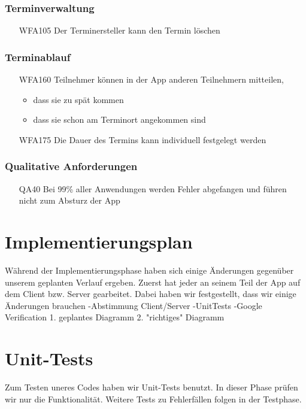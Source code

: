 \documentclass{scrartcl}
\begin{document}
	\subsubsection{Terminverwaltung}
	\begin{itemize}
		\item[WFA105] Der Terminersteller kann den Termin löschen	
	\end{itemize}

	\subsubsection{Terminablauf}
	\begin{itemize}
	\item[WFA160] Teilnehmer können in der App anderen Teilnehmern mitteilen,
		\begin{itemize}
			\item dass sie zu spät kommen
			\item dass sie schon am Terminort angekommen sind
		\end{itemize}
			\item[WFA175] Die Dauer des Termins kann individuell festgelegt werden
	\end{itemize}	

	\subsubsection{Qualitative Anforderungen}
	\begin{itemize}
			\item[QA40] Bei 99\% aller Anwendungen werden Fehler abgefangen und führen nicht zum Absturz der App
	\end{itemize}
	
	\newpage
	\section{Implementierungsplan}
	Während der Implementierungsphase haben sich einige Änderungen gegenüber unserem geplanten Verlauf ergeben.
	Zuerst hat jeder an seinem Teil der App auf dem Client bzw. Server gearbeitet. Dabei haben wir festgestellt, dass wir einige Änderungen brauchen
	-Abstimmung Client/Server
	-UnitTests
	-Google Verification
	1. geplantes Diagramm
	2. "richtiges" Diagramm
	
	\newpage
	\section{Unit-Tests}
	Zum Testen uneres Codes haben wir Unit-Tests benutzt. In dieser Phase prüfen wir nur die Funktionalität. Weitere Tests zu Fehlerfällen folgen in der Testphase.
\end{document}
